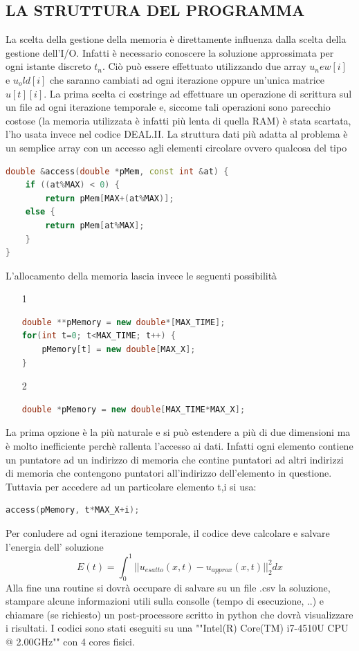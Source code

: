 \documentclass[italian]{article}
\begin{document}
\subsection{LA STRUTTURA DEL PROGRAMMA}
La scelta della gestione della memoria è direttamente influenza dalla scelta della gestione dell'I/O. Infatti è necessario conoscere la soluzione approssimata per ogni istante discreto $t_n$. Ciò può essere effettuato utilizzando due array $u_new[i]$ e $u_old[i]$ che saranno cambiati ad ogni iterazione oppure un'unica matrice $u[t][i]$. La prima scelta ci costringe ad effettuare un operazione di scrittura sul un file ad ogni iterazione temporale e, siccome tali operazioni sono parecchio costose (la memoria utilizzata è infatti più lenta di quella RAM) è stata scartata, l'ho usata invece nel codice DEAL.II. La struttura dati più adatta al problema è un semplice array con un accesso agli elementi circolare ovvero qualcosa del tipo
\lstset{style=mystyle}
\begin{lstlisting}[language=C++]
double &access(double *pMem, const int &at) {
	if ((at%MAX) < 0) {
		return pMem[MAX+(at%MAX)];
	else {
		return pMem[at%MAX];
	}
}
\end{lstlisting}
L'allocamento della memoria lascia invece le seguenti possibilità
\begin{enumerate}
\item[1]
\begin{lstlisting}[language=C++]
double **pMemory = new double*[MAX_TIME];
for(int t=0; t<MAX_TIME; t++) {
	pMemory[t] = new double[MAX_X];
}
\end{lstlisting}
\item[2]
\begin{lstlisting}[language=C++]
double *pMemory = new double[MAX_TIME*MAX_X];
\end{lstlisting}
\end{enumerate}
La prima opzione è la più naturale e si può estendere a più di due dimensioni ma è molto inefficiente perchè rallenta l'accesso ai dati. Infatti ogni elemento contiene un puntatore ad un indirizzo di memoria che contine puntatori ad altri indirizzi di memoria che contengono puntatori all'indirizzo dell'elemento in questione. Tuttavia per accedere ad un particolare elemento t,i si usa:
\begin{lstlisting}[language=C++]
access(pMemory, t*MAX_X+i);
\end{lstlisting}
Per conludere ad ogni iterazione temporale, il codice deve calcolare e salvare l'energia dell' soluzione 
$$E(t) = \int_0^1 ||u_{esatto}(x,t) - u_{approx}(x,t)||_2^2dx$$
Alla fine una routine si dovrà occupare di salvare su un file .csv la soluzione, stampare alcune informazioni utili sulla consolle (tempo di esecuzione, ..) e chiamare (se richiesto) un post-processore scritto in python che dovrà visualizzare i risultati. I codici sono stati eseguiti su una ""Intel(R) Core(TM) i7-4510U CPU @ 2.00GHz"" con 4 cores fisici.
\end{document}
